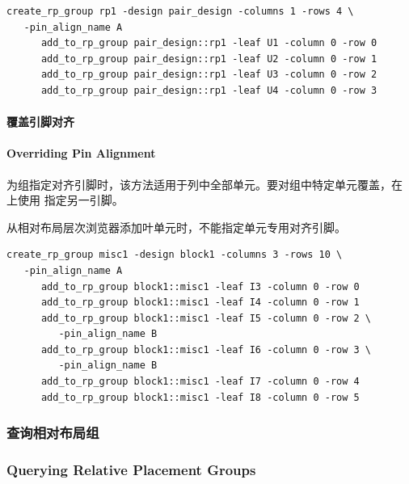 \begin{lstlisting}
create_rp_group rp1 -design pair_design -columns 1 -rows 4 \
   -pin_align_name A
      add_to_rp_group pair_design::rp1 -leaf U1 -column 0 -row 0
      add_to_rp_group pair_design::rp1 -leaf U2 -column 0 -row 1
      add_to_rp_group pair_design::rp1 -leaf U3 -column 0 -row 2
      add_to_rp_group pair_design::rp1 -leaf U4 -column 0 -row 3
\end{lstlisting}


\paragraph{覆盖引脚对齐}
\paragraph*{Overriding Pin Alignment}

为组指定对齐引脚时，该方法适用于列中全部单元。要对组中特定单元覆盖，在  上使用  指定另一引脚。

\begin{noteBox}
从相对布局层次浏览器添加叶单元时，不能指定单元专用对齐引脚。
\end{noteBox}

\begin{lstlisting}
create_rp_group misc1 -design block1 -columns 3 -rows 10 \
   -pin_align_name A
      add_to_rp_group block1::misc1 -leaf I3 -column 0 -row 0
      add_to_rp_group block1::misc1 -leaf I4 -column 0 -row 1
      add_to_rp_group block1::misc1 -leaf I5 -column 0 -row 2 \
         -pin_align_name B
      add_to_rp_group block1::misc1 -leaf I6 -column 0 -row 3 \
         -pin_align_name B
      add_to_rp_group block1::misc1 -leaf I7 -column 0 -row 4
      add_to_rp_group block1::misc1 -leaf I8 -column 0 -row 5
\end{lstlisting}


\subsubsection{查询相对布局组}
\subsubsection*{Querying Relative Placement Groups}

